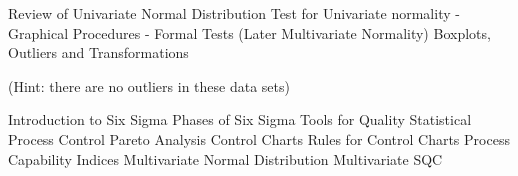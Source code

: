 Review of Univariate Normal Distribution
Test for Univariate normality
 - Graphical Procedures
 - Formal Tests
(Later Multivariate Normality)
Boxplots, Outliers and Transformations

(Hint: there are no outliers in these data sets)

Introduction to Six Sigma
Phases of Six Sigma
Tools for Quality
Statistical Process Control 
Pareto Analysis
Control Charts
Rules for Control Charts
Process Capability Indices
Multivariate Normal Distribution
Multivariate SQC
